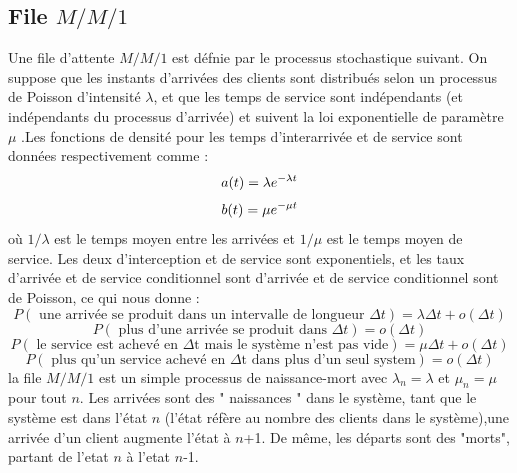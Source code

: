 \documentclass[a4paper,12pt]{report}
\begin{document}
\subsection{File $M/M/1$}
Une file d’attente $M/M/1$ est défnie par le processus stochastique suivant. On suppose que les instants d’arrivées des clients sont distribués selon un processus de Poisson d’intensité $\lambda$, et que les temps de service sont indépendants (et indépendants du processus d’arrivée) et suivent la loi
exponentielle de paramètre $\mu$ .Les fonctions de densité pour les temps d'interarrivée et de service sont données respectivement comme : 
\[\\ a(t) = \lambda e^{-\lambda t} \]
\[\\ b(t) = \mu e^{-\mu t} \]
où $1/\lambda$ est le temps moyen entre les arrivées et $1/\mu$ est le temps moyen de service. Les deux d'interception et de service sont exponentiels, et les taux d'arrivée et de service conditionnel sont d'arrivée et de service conditionnel sont de Poisson, ce qui nous donne :
\small
\[ P{ (\text{ une arrivée se produit dans un intervalle de longueur } \Delta t )} = \lambda \Delta t + o(\Delta t)\]
\[ P{ (\text{  plus d'une arrivée se produit dans } \Delta t )} = o(\Delta t)\]
\[ P{ (\text{ le service est achevé en $\Delta$t mais le système n'est pas vide} )} = \mu \Delta t + o(\Delta t)\]
\[ P{ (\text{ plus qu'un service achevé en $\Delta$t dans plus d'un seul system} )} =  o(\Delta t)\]
la file $M/M/1$ est un simple processus de naissance-mort avec ${\lambda_n = \lambda}$ et ${\mu_n = \mu}$ pour tout $n$. Les arrivées sont des " naissances " dans le système, tant que le système est dans l'état $n$ (l'état  réfère au nombre des clients dans le système),une arrivée d'un client augmente l'état à {$n$+1}. De même, les départs sont des "morts", partant de l'etat $n$ à l'etat $n$-1.
\end{document}
